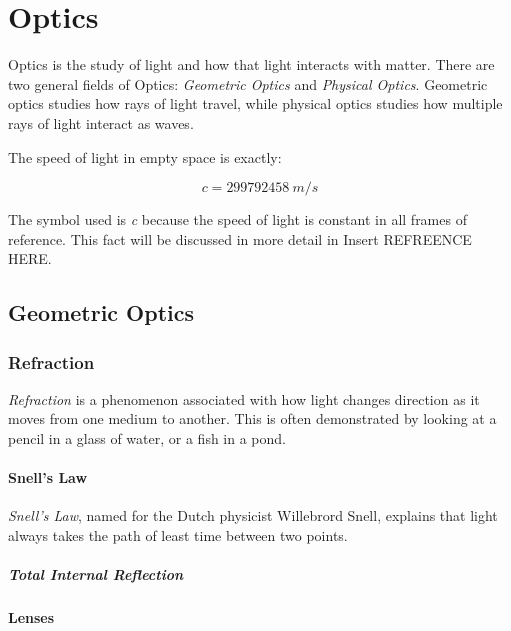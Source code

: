 \chapter{Optics}
	 Optics is the study of light and how that light interacts with matter.  There are two general fields of Optics: \textit{Geometric Optics} and \textit{Physical Optics}. Geometric optics studies how rays of light travel, while physical optics studies how multiple rays of light interact as waves.  
	
	The speed of light in empty space is exactly:	
	\begin{mdframed}[backgroundcolor=green!20!white]
		\begin{equation*}
		c = \SI{299792458}{m/s}
		\label{equation:speedoflight}
		\end{equation*}
	\end{mdframed}	
	
	The symbol used is \textit{c} because the speed of light is constant in all frames of reference.  This fact will be discussed in more detail in Insert REFREENCE HERE.
	
	\section{Geometric Optics} 
	
	\subsection{Refraction} 
	
	\textit{Refraction} is a phenomenon associated with how light changes direction as it moves from one medium to another.  This is often demonstrated by looking at a pencil in a glass of water, or a fish in a pond.  
	
	
		\subsubsection{Snell's Law} 
		\textit{Snell's Law}, named for the Dutch physicist Willebrord Snell, explains that light always takes the path of least time between two points.  
		
		
					\paragraph{Total Internal Reflection}
		\subsubsection{Lenses}

